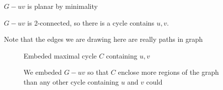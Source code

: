 $G-uv$ is planar by minimality

$G-uv$ is 2-connected, so there is a cycle contains $u,v$.

\begin{remark}
    Note that the edges we are drawing here are really paths in graph
\end{remark}

\begin{figure}[H]
    \begin{minipage}{0.4\textwidth}
    \end{minipage}
    \hfill
    \begin{minipage}{0.5\textwidth}
        Embeded maximal cycle $C$ containing $u,v$
    \end{minipage}

\end{figure}

\begin{figure}[H]
    \begin{minipage}{0.4\textwidth}
    \end{minipage}
    \hfill
    \begin{minipage}{0.5\textwidth}
        We embeded $G -uv$ so that $C$ enclose more regions of the graph than any other cycle containing $u$ and $v$ could
    \end{minipage}

\end{figure}

